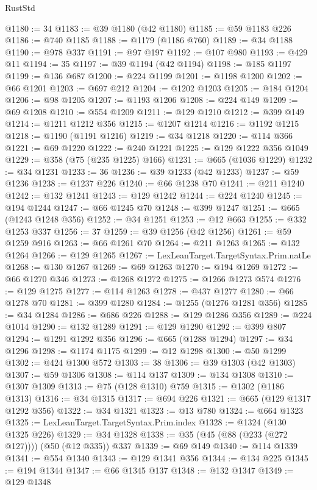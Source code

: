 \begin{lexlean}{RustStd}
\begin{coremodule}
@1180 := 34
@1183 := @39 @1180 (@42 @1180)
@1185 := @59 @1183 @226
@1186 := @740 @1185
@1188 := @1179 (@1186 @760)
@1189 := @34 @1188
@1190 := @978 @337
@1191 := @97 @197
@1192 := @107 @980
@1193 := @429 @11
@1194 := 35
@1197 := @39 @1194 (@42 @1194)
@1198 := @185 @1197
@1199 := @136 @687
@1200 := @224 @1199
@1201 := @1198 @1200
@1202 := @66 @1201
@1203 := @697 @212
@1204 := @1202 @1203
@1205 := @184 @1204
@1206 := @98 @1205
@1207 := @1193 @1206
@1208 := @224 @149
@1209 := @69 @1208
@1210 := @554 @1209
@1211 := @129 @1210
@1212 := @399 @149
@1214 := @1211 @1212 @356
@1215 := @1207 @1214
@1216 := @1192 @1215
@1218 := @1190 (@1191 @1216)
@1219 := @34 @1218
@1220 := @114 @366
@1221 := @69 @1220
@1222 := @240 @1221
@1225 := @129 @1222 @356 @1049
@1229 := @358 (@75 (@235 @1225) @166)
@1231 := @665 (@1036 @1229)
@1232 := @34 @1231
@1233 := 36
@1236 := @39 @1233 (@42 @1233)
@1237 := @59 @1236
@1238 := @1237 @226
@1240 := @66 @1238 @70
@1241 := @211 @1240
@1242 := @132 @1241
@1243 := @129 @1242
@1244 := @224 @1240
@1245 := @194 @1244
@1247 := @66 @1245 @70
@1248 := @399 @1247
@1251 := @665 (@1243 @1248 @356)
@1252 := @34 @1251
@1253 := @12 @663
@1255 := @332 @1253 @337
@1256 := 37
@1259 := @39 @1256 (@42 @1256)
@1261 := @59 @1259 @916
@1263 := @66 @1261 @70
@1264 := @211 @1263
@1265 := @132 @1264
@1266 := @129 @1265
@1267 := LexLeanTarget.TargetSyntax.Prim.natLe
@1268 := @130 @1267
@1269 := @69 @1263
@1270 := @194 @1269
@1272 := @66 @1270 @346
@1273 := @1268 @1272
@1275 := @1266 @1273 @574
@1276 := @129 @1275
@1277 := @114 @1263
@1278 := @437 @1277
@1280 := @66 @1278 @70
@1281 := @399 @1280
@1284 := @1255 (@1276 @1281 @356)
@1285 := @34 @1284
@1286 := @686 @226
@1288 := @129 @1286 @356
@1289 := @224 @1014
@1290 := @132 @1289
@1291 := @129 @1290
@1292 := @399 @807
@1294 := @1291 @1292 @356
@1296 := @665 (@1288 @1294)
@1297 := @34 @1296
@1298 := @1174 @1175
@1299 := @12 @1298
@1300 := @50 @1299
@1302 := @424 @1300 @572
@1303 := 38
@1306 := @39 @1303 (@42 @1303)
@1307 := @59 @1306
@1308 := @114 @137
@1309 := @134 @1308
@1310 := @1307 @1309
@1313 := @75 (@128 @1310) @759
@1315 := @1302 (@1186 @1313)
@1316 := @34 @1315
@1317 := @694 @226
@1321 := @665 (@129 @1317 @1292 @356)
@1322 := @34 @1321
@1323 := @13 @780
@1324 := @664 @1323
@1325 := LexLeanTarget.TargetSyntax.Prim.index
@1328 := @1324 (@130 @1325 @226)
@1329 := @34 @1328
@1338 := @35 (@45 (@88 (@233 (@272 @127)))) (@50 (@12 @335)) @337
@1339 := @69 @149
@1340 := @114 @1339
@1341 := @554 @1340
@1343 := @129 @1341 @356
@1344 := @134 @225
@1345 := @194 @1344
@1347 := @66 @1345 @137
@1348 := @132 @1347
@1349 := @129 @1348

\end{coremodule}
\end{lexlean}
